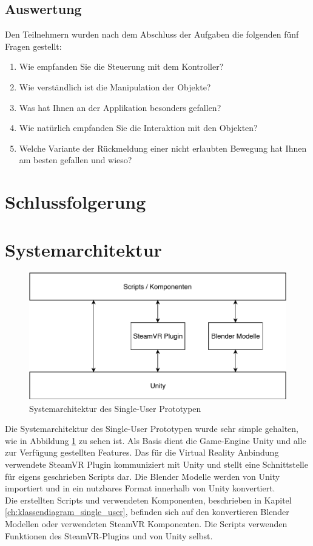 \subsection{Auswertung}
Den Teilnehmern wurden nach dem Abschluss der Aufgaben die folgenden fünf Fragen gestellt:

\begin{enumerate} [itemsep=1pt,topsep=0pt]
	\item Wie empfanden Sie die Steuerung mit dem Kontroller?
	
	\item Wie verständlich ist die Manipulation der Objekte?
	
	\item Was hat Ihnen an der Applikation besonders gefallen?
	
	\item Wie natürlich empfanden Sie die Interaktion mit den Objekten?
	
	\item Welche Variante der Rückmeldung einer nicht erlaubten Bewegung hat Ihnen am besten gefallen und wieso?
\end{enumerate}


\section{Schlussfolgerung}

\section{Systemarchitektur}
\begin{figure}[h!]
	\centering
	\includegraphics[keepaspectratio,width=0.75\linewidth]{img/ArchitekturT1.pdf}
	\caption{Systemarchitektur des Single-User Prototypen}
	\label{fig:systemarchitektur_single_user}
\end{figure}

Die Systemarchitektur des Single-User Prototypen wurde sehr simple gehalten, wie in Abbildung \ref{fig:systemarchitektur_single_user} zu sehen ist. Als Basis dient die Game-Engine Unity und alle zur Verfügung gestellten Features. Das für die Virtual Reality Anbindung verwendete SteamVR Plugin kommuniziert mit Unity und stellt eine Schnittstelle für eigens geschrieben Scripts dar. Die Blender Modelle werden von Unity importiert und in ein nutzbares Format innerhalb von Unity konvertiert. \\
Die erstellten Scripts und verwendeten Komponenten, beschrieben in Kapitel \ref{ch:klassendiagram_single_user}, befinden sich auf den konvertieren Blender Modellen oder verwendeten SteamVR Komponenten. Die Scripts verwenden Funktionen des SteamVR-Plugins und von Unity selbst.


